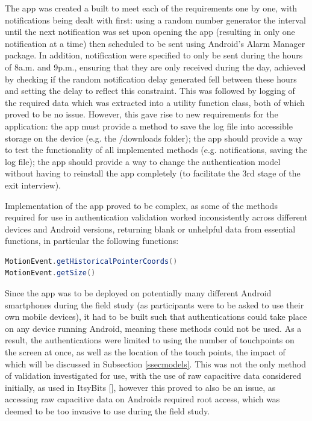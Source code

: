 \documentclass{l4proj}
\begin{document}
The app was created a built to meet each of the requirements one by one, with notifications being dealt with first: using a random number generator the interval until the next notification was set upon opening the app (resulting in only one notification at a time) then scheduled to be sent using Android's Alarm Manager package. In addition, notification were specified to only be sent during the hours of 8a.m. and 9p.m., ensuring that they are only received during the day, achieved by checking if the random notification delay generated fell between these hours and setting the delay to reflect this constraint. This was followed by logging of the required data which was extracted into a utility function class, both of which proved to be no issue. However, this gave rise to new requirements for the application: the app must provide a method to save the log file into accessible storage on the device (e.g. the /downloads folder); the app should provide a way to test the functionality of all implemented methods (e.g. notifications, saving the log file); the app should provide a way to change the authentication model without having to reinstall the app completely (to facilitate the 3rd stage of the exit interview).

Implementation of the app proved to be complex, as some of the methods required for use in authentication validation worked inconsistently across different devices and Android versions, returning blank or unhelpful data from essential functions, in particular the following functions: 
\begin{lstlisting}[language=java]
MotionEvent.getHistoricalPointerCoords() 
MotionEvent.getSize()
\end{lstlisting}
Since the app was to be deployed on potentially many different Android smartphones during the field study (as participants were to be asked to use their own mobile devices), it had to be built such that authentications could take place on any device running Android, meaning these methods could not be used. As a result, the authentications were limited to using the number of touchpoints on the screen at once, as well as the location of the touch points, the impact of which will be discussed in Subsection \ref{ssecmodels}. This was not the only method of validation investigated for use, with the use of raw capacitive data considered initially, as used in ItsyBits [\cite{schmitz2021itsy}], however this proved to also be an issue, as accessing raw capacitive data on Androids required root access, which was deemed to be too invasive to use during the field study.
\end{document}
